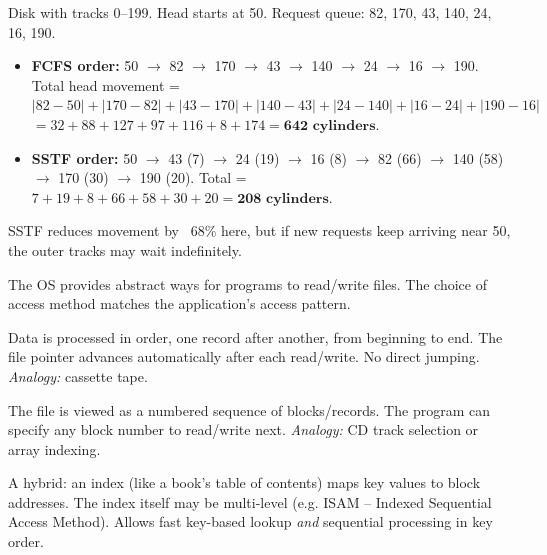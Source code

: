 \documentclass[11pt]{article}
\newcommand{\cle}[1]{{\popxbold\color{popdark}#1}}
\newcounter{popsec}
\newcounter{popsub}
\newcommand{\courssub}[1]{%
  \stepcounter{popsub}%
  \par\vspace{9pt}\noindent{\popxbold\fontsize{11.5}{13}\selectfont\color{popink}{\color{poporange}\thepopsec.\thepopsub}\hspace{6pt}#1}\par\nopagebreak\vspace{4pt}
}
\begin{document}
\begin{exemplebox}
Disk with tracks 0--199.  Head starts at 50.  Request queue: 82, 170, 43, 140, 24, 16, 190.
\begin{itemize}
  \item \textbf{FCFS order:} 50 $\to$ 82 $\to$ 170 $\to$ 43 $\to$ 140 $\to$ 24 $\to$ 16 $\to$ 190.  
        Total head movement = $|82-50| + |170-82| + |43-170| + |140-43| + |24-140| + |16-24| + |190-16|$  
        $= 32 + 88 + 127 + 97 + 116 + 8 + 174 = \textbf{642 cylinders}$.
  \item \textbf{SSTF order:} 50 $\to$ 43 (7) $\to$ 24 (19) $\to$ 16 (8) $\to$ 82 (66) $\to$ 140 (58) $\to$ 170 (30) $\to$ 190 (20).  
        Total = $7 + 19 + 8 + 66 + 58 + 30 + 20 = \textbf{208 cylinders}$.
\end{itemize}
SSTF reduces movement by ~68\% here, but if new requests keep arriving near 50, the outer tracks may wait indefinitely.
\end{exemplebox}

\courssub{File Access Methods}

The OS provides abstract ways for programs to read/write files.  The choice of access method matches the application's access pattern.

\begin{definition}
Data is processed in order, one record after another, from beginning to end.  The file pointer advances automatically after each read/write.  No direct jumping.  \emph{Analogy:} cassette tape.
\end{definition}

\begin{definition}
The file is viewed as a numbered sequence of blocks/records.  The program can specify any block number to read/write next.  \emph{Analogy:} CD track selection or array indexing.
\end{definition}

\begin{definition}
A hybrid: an \cle{index} (like a book's table of contents) maps key values to block addresses.  The index itself may be multi-level (e.g. ISAM -- Indexed Sequential Access Method).  Allows fast key-based lookup \emph{and} sequential processing in key order.
\end{definition}
\end{document}
